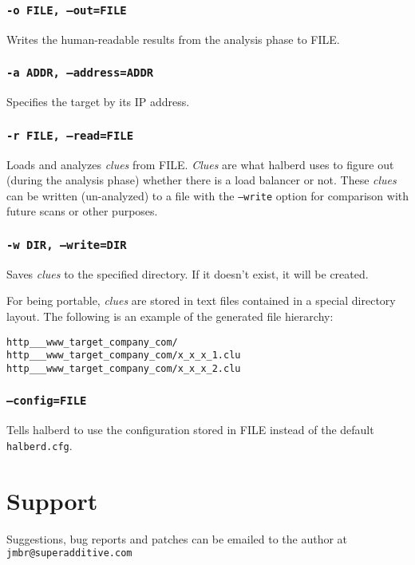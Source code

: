 \documentclass[a4paper]{book}
\begin{document}
\subsection{\texttt{-o FILE, --out=FILE}}

Writes the human-readable results from the analysis phase to FILE.

\subsection{\texttt{-a ADDR, --address=ADDR}}

Specifies the target by its IP address.

\subsection{\texttt{-r FILE, --read=FILE}}

\label{sec:read}
Loads and analyzes \emph{clues} from FILE.  \emph{Clues} are what halberd uses
to figure out (during the analysis phase) whether there is a load balancer or
not.  These \emph{clues} can be written (un-analyzed) to a file with the
\texttt{--write} option for comparison with future scans or other purposes.

\subsection{\texttt{-w DIR, --write=DIR}}

\label{sec:write}
Saves \emph{clues} to the specified directory.  If it doesn't exist, it will be
created.

For being portable, \emph{clues} are stored in text files contained in a
special directory layout.  The following is an example of the generated file
hierarchy:

\begin{verbatim}
http___www_target_company_com/
http___www_target_company_com/x_x_x_1.clu
http___www_target_company_com/x_x_x_2.clu
\end{verbatim}

\subsection{\texttt{--config=FILE}}

Tells halberd to use the configuration stored in FILE instead of the default
\verb|halberd.cfg|.

\chapter{Support}

Suggestions, bug reports and patches can be emailed to the author at
\texttt{jmbr@superadditive.com}
\end{document}
